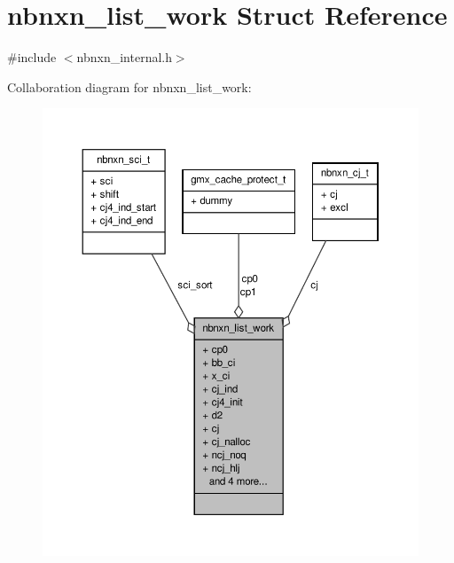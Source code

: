 \hypertarget{structnbnxn__list__work}{\section{nbnxn\-\_\-list\-\_\-work \-Struct \-Reference}
\label{structnbnxn__list__work}
}


{\ttfamily \#include $<$nbnxn\-\_\-internal.\-h$>$}



\-Collaboration diagram for nbnxn\-\_\-list\-\_\-work\-:
\nopagebreak
\begin{figure}[H]
\begin{center}
\leavevmode
\includegraphics[width=350pt]{structnbnxn__list__work__coll__graph}
\end{center}
\end{figure}
